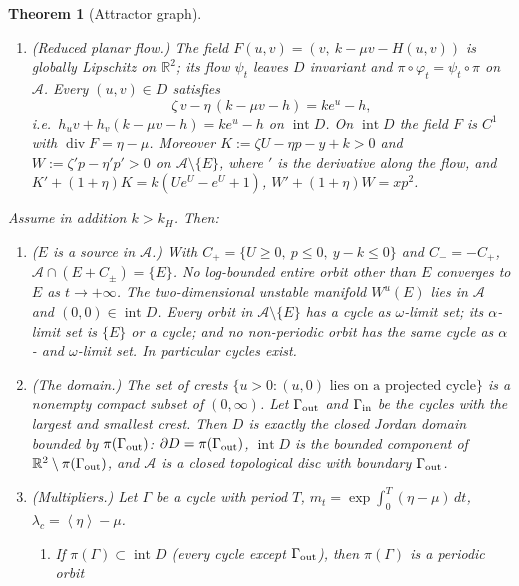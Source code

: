 \documentclass[11pt,a4paper]{article}
\numberwithin{equation}{section}
\newtheorem{theorem}{Theorem}[section]
\theoremstyle{remark}\newtheorem{remark}[theorem]{Remark}
\newcommand{\R}{\mathbb R}
\newcommand{\cA}{\mathcal A}
\newcommand{\avg}[1]{\left\langle #1\right\rangle}
\DeclareMathOperator{\inter}{int}
\DeclareMathOperator{\diver}{div}
\begin{document}
\begin{theorem}[Attractor graph]
\begin{enumerate}[label=\textup{(A\arabic*)}]
Consequently $h$ is differentiable at every interior point of $D$, $h\in C^1(\inter D)$ and
\[
\nabla h=(\zeta,-\eta),\qquad h_u=\zeta>0,\qquad h_v=-\eta<-\max(0,\mu-1)\quad\text{on }\inter D,
\]
and $(h,g)$ is a Whitney $C^1$ jet on the compact set $D$.
\item \textup{(Reduced planar flow.)} The field $F(u,v)=(v,\ k-\mu v-H(u,v))$ is globally Lipschitz on $\R^2$; its
flow $\psi_t$ leaves $D$ invariant and $\pi\circ\varphi_t=\psi_t\circ\pi$ on $\cA$. Every $(u,v)\in D$ satisfies
\begin{equation}\label{eq:pde}
\zeta\,v-\eta\,(k-\mu v-h)=ke^{u}-h ,
\end{equation}
i.e.\ $h_uv+h_v(k-\mu v-h)=ke^{u}-h$ on $\inter D$. On $\inter D$ the field $F$ is $C^1$ with
$\diver F=\eta-\mu$. Moreover $K:=\zeta U-\eta p-y+k>0$ and $W:=\zeta'p-\eta'p'>0$ on $\cA\setminus\{E\}$, where
$'$ is the derivative along the flow, and $K'+(1+\eta)K=k(Ue^{U}-e^{U}+1)$, $W'+(1+\eta)W=xp^2$.
\end{enumerate}
Assume in addition $k>k_H$. Then:
\begin{enumerate}[label=\textup{(A\arabic*)},resume]
\item \textup{($E$ is a source in $\cA$.)} With $C_+=\{U\ge0,\ p\le0,\ y-k\le0\}$ and $C_-=-C_+$,
$\cA\cap(E+C_\pm)=\{E\}$. No log-bounded entire orbit other than $E$ converges to $E$ as $t\to+\infty$. The
two-dimensional unstable manifold $W^u(E)$ lies in $\cA$ and $(0,0)\in\inter D$. Every orbit in $\cA\setminus\{E\}$
has a cycle as $\omega$-limit set; its $\alpha$-limit set is $\{E\}$ or a cycle; and no non-periodic orbit has the
same cycle as $\alpha$- and $\omega$-limit set. In particular cycles exist.
\item \textup{(The domain.)} The set of crests $\{u>0:(u,0)\text{ lies on a projected cycle}\}$ is a nonempty compact
subset of $(0,\infty)$. Let $\Gamma_{\rm out}$ and $\Gamma_{\rm in}$ be the cycles with the largest and smallest
crest. Then $D$ is exactly the closed Jordan domain bounded by $\pi(\Gamma_{\rm out})$:
$\partial D=\pi(\Gamma_{\rm out})$, $\inter D$ is the bounded component of $\R^2\setminus\pi(\Gamma_{\rm out})$, and
$\cA$ is a closed topological disc with boundary $\Gamma_{\rm out}$.
\item \textup{(Multipliers.)} Let $\Gamma$ be a cycle with period $T$, $m_t=\exp\int_0^T(\eta-\mu)\,dt$,
$\lambda_c=\avg\eta-\mu$.
\begin{enumerate}[label=\textup{(\alph*)}]
\item If $\pi(\Gamma)\subset\inter D$ (every cycle except $\Gamma_{\rm out}$), then $\pi(\Gamma)$ is a periodic orbit

\end{enumerate}
\end{enumerate}
\end{theorem}
\end{document}
